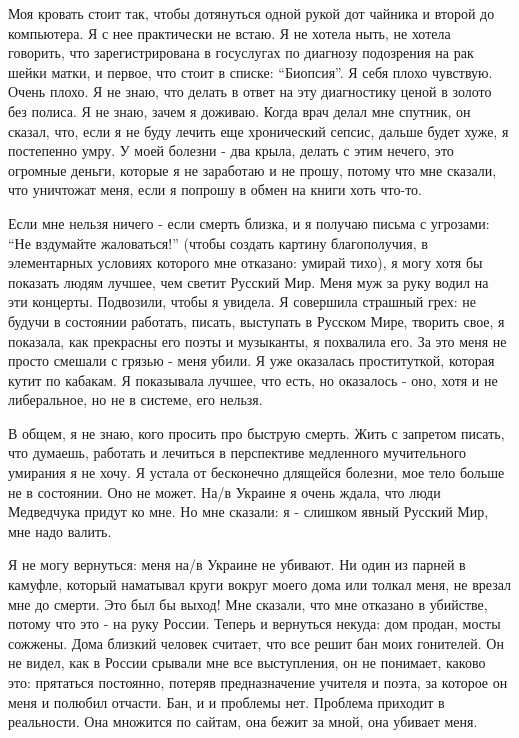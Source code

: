 Моя кровать стоит так, чтобы дотянуться одной рукой дот чайника и второй до
компьютера. Я с нее практически не встаю. Я не хотела ныть, не хотела говорить,
что зарегистрирована в госуслугах по диагнозу подозрения на рак шейки матки, и
первое, что стоит в списке: \enquote{Биопсия}. Я себя плохо чувствую. Очень плохо. Я не
знаю, что делать в ответ на эту диагностику ценой в золото без полиса. Я не
знаю, зачем я доживаю. Когда врач делал мне спутник, он сказал, что, если я не
буду лечить еще хронический сепсис, дальше будет хуже, я постепенно умру. У
моей болезни - два крыла, делать с этим нечего, это огромные деньги, которые я
не заработаю и не прошу, потому что мне сказали, что уничтожат меня, если я
попрошу в обмен на книги хоть что-то.  

Если мне нельзя ничего - если смерть близка, и я получаю письма с угрозами: \enquote{Не
вздумайте жаловаться!} (чтобы создать картину благополучия, в элементарных
условиях которого мне отказано: умирай тихо), я могу хотя бы показать людям
лучшее, чем светит Русский Мир. Меня муж за руку водил на эти концерты.
Подвозили, чтобы я увидела. Я совершила страшный грех: не будучи в состоянии
работать, писать, выступать в Русском Мире, творить свое, я показала, как
прекрасны его поэты и музыканты, я похвалила его. За это меня не просто смешали
с грязью - меня убили. Я уже оказалась проституткой, которая кутит по кабакам.
Я показывала лучшее, что есть, но оказалось - оно, хотя и не либеральное, но не
в системе, его нельзя. 

В общем, я не знаю, кого просить про быструю смерть. Жить с запретом писать,
что думаешь, работать и лечиться в перспективе медленного мучительного умирания
я не хочу. Я устала от бесконечно длящейся болезни, мое тело больше не в
состоянии. Оно не может. На/в Украине я очень ждала, что люди Медведчука придут
ко мне. Но мне сказали: я - слишком явный Русский Мир, мне надо валить.

Я не могу вернуться: меня на/в Украине не убивают. Ни один из парней в камуфле,
который наматывал круги вокруг моего дома или толкал меня, не врезал мне до
смерти. Это был бы выход! Мне сказали, что мне отказано в убийстве, потому что
это - на руку России. Теперь и вернуться некуда: дом продан, мосты сожжены.
Дома близкий человек считает, что все решит бан моих гонителей. Он не видел,
как в России срывали мне все выступления, он не понимает, каково это: прятаться
постоянно, потеряв предназначение учителя и поэта, за которое он меня и полюбил
отчасти. Бан, и и проблемы нет. Проблема приходит в реальности. Она множится по
сайтам, она бежит за мной, она убивает меня.

